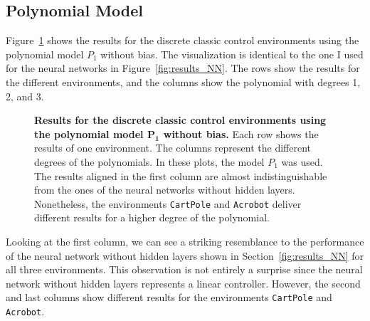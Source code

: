 \subsection{Polynomial Model}
Figure~\ref{fig:results_Polynomial} shows the results for the discrete classic control environments using the polynomial model $P_1$ without bias. The visualization is identical to the one I used for the neural networks in Figure~\ref{fig:results_NN}. The rows show the results for the different environments, and the columns show the polynomial with degrees 1, 2, and 3.
\begin{figure}[!ht]
\begin{figrow}
\item \label{row:Polynomial_CartPole}  
\item \label{row:Polynomial_Acrobot}  
\item \label{row:Polynomial_MountainCar}  
\end{figrow}
\caption[Results for the discrete classic control environments using the polynomial model $\mathbf{P_1}$ without bias]{
  \textbf{Results for the discrete classic control environments using the polynomial model $\mathbf{P_1}$ without bias.}
   Each row shows the results of one environment. The columns represent the different degrees of the polynomials. In these plots, the model $P_1$ was used. The results aligned in the first column are almost indistinguishable from the ones of the neural networks without hidden layers. Nonetheless, the environments \texttt{CartPole} and \texttt{Acrobot} deliver different results for a higher degree of the polynomial.
}
\label{fig:results_Polynomial}
\end{figure}
Looking at the first column, we can see a striking resemblance to the performance of the neural network without hidden layers shown in Section~\ref{fig:results_NN} for all three environments. This observation is not entirely a surprise since the neural network without hidden layers represents a linear controller. However, the second and last columns show different results for the environments \verb|CartPole| and \verb|Acrobot|.

